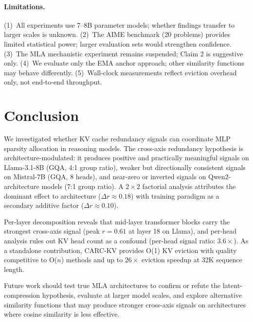 \documentclass[11pt,a4paper]{article}
\begin{document}
\paragraph{Limitations.}
(1)~All experiments use 7--8B parameter models; whether findings transfer to larger scales is unknown.
(2)~The AIME benchmark (20 problems) provides limited statistical power; larger evaluation sets would strengthen confidence.
(3)~The MLA mechanistic experiment remains suspended; Claim 2 is suggestive only.
(4)~We evaluate only the EMA anchor approach; other similarity functions may behave differently.
(5)~Wall-clock measurements reflect eviction overhead only, not end-to-end throughput.

\section{Conclusion}
\label{sec:conclusion}

We investigated whether KV cache redundancy signals can coordinate MLP sparsity allocation in reasoning models.
The cross-axis redundancy hypothesis is architecture-modulated: it produces positive and practically meaningful signals on Llama-3.1-8B (GQA, 4:1 group ratio), weaker but directionally consistent signals on Mistral-7B (GQA, 8 heads), and near-zero or inverted signals on Qwen2-architecture models (7:1 group ratio).
A $2\times 2$ factorial analysis attributes the dominant effect to architecture ($\Delta r{\approx}0.18$) with training paradigm as a secondary additive factor ($\Delta r{\approx}0.10$).

Per-layer decomposition reveals that mid-layer transformer blocks carry the strongest cross-axis signal (peak $r{=}0.61$ at layer 18 on Llama), and per-head analysis rules out KV head count as a confound (per-head signal ratio: $3.6\times$).
As a standalone contribution, CARC-KV provides O(1) KV eviction with quality competitive to O($n$) methods and up to $26\times$ eviction speedup at 32K sequence length.

Future work should test true MLA architectures to confirm or refute the latent-compression hypothesis, evaluate at larger model scales, and explore alternative similarity functions that may produce stronger cross-axis signals on architectures where cosine similarity is less effective.

\end{document}
